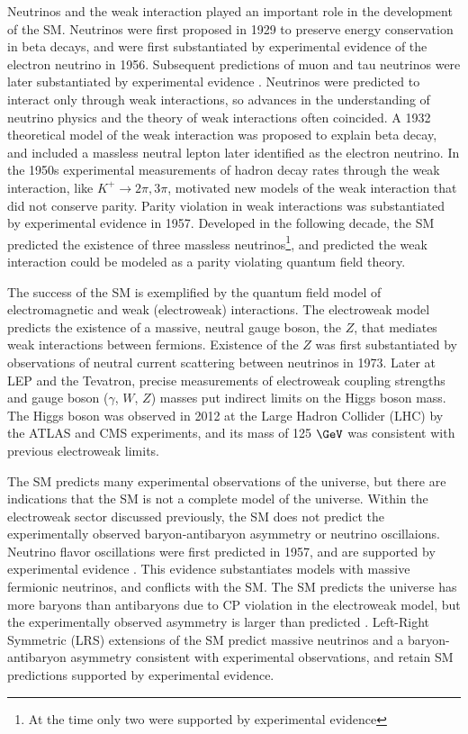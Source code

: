 Neutrinos and the weak interaction played an important role in the development of the SM.  
Neutrinos were first proposed in 1929 to preserve energy conservation in beta decays, and were first 
substantiated by experimental evidence \cite{firstNuDiscovery} of the electron neutrino in 1956.  
Subsequent predictions of muon and tau neutrinos were later substantiated 
by experimental evidence \cite{muNuDiscovery,tauNuDiscovery}.  Neutrinos were predicted to interact only through weak 
interactions, so advances in the understanding of neutrino physics and the theory of weak interactions often coincided.  
A 1932 theoretical model of the weak interaction was proposed to explain beta decay, and included a massless 
neutral lepton later identified as the electron neutrino.  In the 1950s experimental measurements of 
hadron decay rates through the weak interaction, like $K^{+} \rightarrow 2\pi, 3\pi$, motivated new 
models of the weak interaction that did not conserve parity.  Parity violation in weak interactions was 
substantiated by experimental evidence \cite{weakParityViolation} in 1957.  Developed in the following decade, the 
SM predicted the existence of three massless neutrinos\footnote{At the time only two were supported 
by experimental evidence}, and predicted the weak interaction could be modeled as a parity violating 
quantum field theory.

The success of the SM is exemplified by the quantum field model of electromagnetic and weak (electroweak) 
interactions.  The electroweak model predicts the existence of a massive, neutral gauge boson, the $Z$, 
that mediates weak interactions between fermions.  Existence of the $Z$ was first substantiated by 
observations of neutral current scattering between neutrinos \cite{nuScattering} in 1973.  Later at 
LEP and the Tevatron, precise measurements of electroweak coupling strengths and gauge boson ($\gamma$, $W$, $Z$) 
masses put indirect limits on the Higgs boson mass.  The Higgs boson was observed in 2012 at the Large Hadron Collider 
(LHC) by the ATLAS and CMS experiments, and its mass\cite{combinedHiggsResult} of 125 $\GeV$ was consistent 
with previous electroweak limits.

The SM predicts many experimental observations of the universe, but there are indications that the SM is 
not a complete model of the universe.  Within the electroweak sector discussed previously, the SM does 
not predict the experimentally observed baryon-antibaryon asymmetry or neutrino oscillaions.  Neutrino flavor 
oscillations were first predicted in 1957, and are supported by experimental evidence 
\cite{kamiokandeTwo,solarNuSummary,NOvAresults,mainzPhaseIIResults,t2kResults}.  This evidence substantiates 
models with massive fermionic neutrinos, and conflicts with the SM.  The SM predicts the universe has more 
baryons than antibaryons due to CP violation in the electroweak model, but the experimentally observed 
asymmetry is larger than predicted \cite{surveyOfExtensions}.  Left-Right Symmetric (LRS) extensions of 
the SM predict massive neutrinos and a baryon-antibaryon asymmetry consistent with experimental observations, 
and retain SM predictions supported by experimental evidence.

